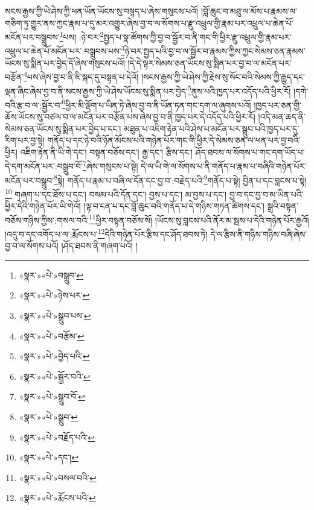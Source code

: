 སངས་རྒྱས་ཀྱི་ཡེ་ཤེས་ཀྱི་ཕན་ཡོན་ཡོངས་སུ་བསྙད་པ་ཞེས་གསུངས་པའོ། །བློ་ཆུང་བ་མཐུ་ལ་མོས་པ་རྣམས་ལ་གཅིག་ཏུ་གྱུར་ནས་ཀྱང་རྣམ་པ་དུ་མར་འགྱུར་ཞེས་བྱ་བ་ལ་སོགས་པ་རྫུ་འཕྲུལ་གྱི་རྣམ་པར་འཕྲུལ་པ་ཆེན་པོ་མངོན་པར་བསྒྲུབས་\footnote{«སྣར་»«པེ་»བསྒྲུབ་}པས། :ཉེ་བར་\footnote{«སྣར་»«པེ་»ཉེས་པར་}སྤྱད་པ་སྣ་ཚོགས་ཀྱི་བྱ་བ་སྦྱོར་བ་ནི་གང་གི་ཕྱིར་རྫུ་འཕྲུལ་གྱི་རྣམ་པར་འཕྲུལ་པ་ཆེན་པོ་མངོན་པར་:བསྒྲུབས་པས་\footnote{«སྣར་»«པེ་»སྒྲུབ་པས་}ཉེ་བར་སྤྱད་པའི་བྱ་བ་ལ་སྦྱོར་བ་རྣམས་ཀྱིས་ཀྱང་སེམས་ཅན་རྣམས་ཡོངས་སུ་སྨིན་པར་བྱེད་དོ་ཞེས་གསུངས་པའོ། །དེ་དེ་ལྟར་སེམས་ཅན་ཡོངས་སུ་སྨིན་པར་བྱ་བ་ལ་མངོན་པར་བརྩོན་\footnote{«སྣར་»«པེ་»བརྩོམ་}པས་ཞེས་བྱ་བ་ནི་ཇི་སྐད་དུ་བསྟན་པ་དེའོ། །སངས་རྒྱས་ཀྱི་ཡེ་ཤེས་ཀྱི་རྗེས་སུ་སོང་བའི་སེམས་ཀྱི་རྒྱུད་དང་ལྡན་ཞིང་ཞེས་བྱ་བ་ནི་སངས་རྒྱས་ཀྱི་ཡེ་ཤེས་ཡོངས་སུ་སྨིན་པར་བྱེད་\footnote{«སྣར་»«པེ་»བྱེད་པའི་}ནུས་པའི་ཁྱད་པར་འདོད་པའི་ཕྱིར་རོ། །དགེ་བའི་རྩ་བ་ལ་:སྦྱོར་བ་\footnote{«སྣར་»«པེ་»སྦྱོར་བའི་}ཕྱིར་མི་ལྡོག་པ་ཡིན་ཏེ་ཞེས་བྱ་བ་ནི་ཡོན་ཏན་གང་དག་ལ་ཞུགས་པའོ། །ཁྱད་པར་ཅན་གྱི་ཆོས་ཡོངས་སུ་བཙལ་བ་ལ་མངོན་པར་བརྩོན་པས་ཞེས་བྱ་བ་ནི་ཁྱད་པར་དེ་འདོད་པའི་ཕྱིར་རོ། །འདི་མན་ཆད་ནི་སེམས་ཅན་ཡོངས་སུ་སྨིན་པར་བྱེད་པ་དང་། མཐུན་པ་འཇིག་རྟེན་པའི་ཤེས་པ་མངོན་པར་སྒྲུབ་པའི་ཁྱད་པར་དུ་རིག་པར་བྱ་སྟེ། གནོད་པ་དང་ཉེ་བའི་ཉོན་མོངས་པའི་གཉེན་པོར་གང་གི་ཕྱིར་དེ་སེམས་ཅན་ལ་ཕན་པར་བྱ་བའི་ཕྱིར། འཇིག་རྟེན་ནི་ཡི་གེ་དང་། བསྟན་བཅོས་དང་། རྒྱ་དང་། རྩིས་དང་། ཤོད་ཐབས་ལ་སོགས་པ་གང་དག་ཡོད་པ་དེ་དག་མངོན་པར་:བསྒྲུབ་བོ་\footnote{«སྣར་»«པེ་»སྒྲུབ་བོ་}ཞེས་གསུངས་པ་སྟེ། དེ་ལ་ཡི་གེ་ལ་སོགས་པ་ནི་གནོད་པ་རྣམ་པ་བཞིའི་གཉེན་པོར་མངོན་པར་བསྒྲུབ་\footnote{«སྣར་»«པེ་»སྒྲུབ་}སྟེ། གནོད་པ་རྣམ་པ་བཞི་ལ་དོན་དང་བྱ་བ་:བརྗེད་པའི་\footnote{«སྣར་»«པེ་»བརྗོད་པའི་}གནོད་པ་སྟེ། བྱིན་པ་དང་བླངས་པ་སྟེ།\footnote{«སྣར་»«པེ་»དང་།} གཞག་པ་དང་ཐོས་པ་དང་། བསམ་པའི་དོན་དང་། བྱས་པ་དང་། མ་བྱས་པ་དང་། བྱ་བ་དང་བྱ་བ་མ་ཡིན་པའི་ཕྱིར་དེའི་གཉེན་པོར་ཡི་གེའོ། །ལྟ་བ་ངན་པ་དང་བློ་ཆུང་བའི་གནོད་པ་དེ་གཉིས་གཏན་ཚིགས་དང་། སྒྲའི་བསྟན་བཅོས་གཉིས་ཀྱིས་:གསལ་བའི་\footnote{«སྣར་»«པེ་»བསལ་བའི་}ཕྱིར་བསྟན་བཅོས་སོ། །ཡོངས་སུ་བླངས་པའི་ནོར་མ་སྦས་པ་དེའི་གཉེན་པོར་རྒྱའོ། །འདུ་བ་དང་འགོད་པ་ལ་:རྨོངས་པ་\footnote{«སྣར་»«པེ་»རྨོངས་པའི་}དེའི་གཉེན་པོར་རྩིས་དང་ཤོད་ཐབས་ཏེ། དེ་ལ་རྩིས་ནི་གཉིས་གཉིས་བཞི་ཞེས་བྱ་བ་ལ་སོགས་པའོ། །ཤོད་ཐབས་ནི་གཞག་པའོ། །
